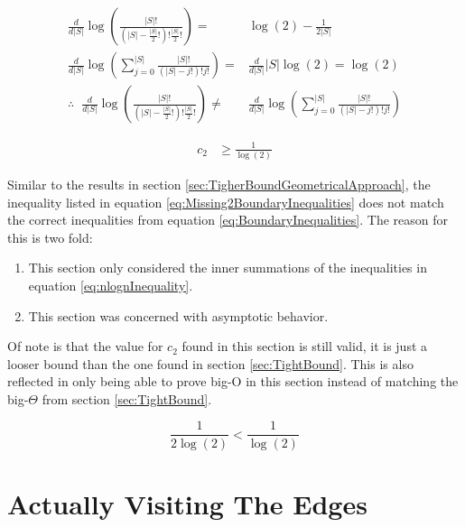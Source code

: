 \documentclass{article}
\begin{document}
\begin{equation*}
	\begin{split}
		\frac{d}{d|S|}				
		\log \left( \frac{
			|S|!
		}{
			\left(|S|-\frac{|S|}{2}!\right)!\frac{|S|}{2}!
		} \right)
		= &
		\log(2)-\frac{1}{2|S|}
		\\
		\frac{d}{d|S|}				
		\log \left( \sum_{j=0}^{|S|} \frac{
			|S|!
		}{
			\left(|S|-j!\right)!j!
		} \right)
		= &
		\frac{d}{d|S|} |S|\log(2)=\log(2)
		\\
		\therefore  \;\;
		\frac{d}{d|S|}				
		\log \left( \frac{
			|S|!
		}{
			\left(|S|-\frac{|S|}{2}!\right)!\frac{|S|}{2}!
		} \right)
		\ne &
		\frac{d}{d|S|}				
		\log \left( \sum_{j=0}^{|S|} \frac{
			|S|!
		}{
			\left(|S|-j!\right)!j!
		} \right)
	\end{split}	
\end{equation*}

\begin{equation}
	\begin{split}
        c_2 &\ge \frac{1}{\log(2)}
	\end{split}
	\label{eq:Missing2BoundaryInequalities}
\end{equation}

Similar to the results in section \ref{sec:TigherBoundGeometricalApproach}, the inequality listed in equation \ref{eq:Missing2BoundaryInequalities} does not match the correct inequalities from equation \ref{eq:BoundaryInequalities}. The reason for this is two fold:

\begin{enumerate}
	\item This section only considered the inner summations of the inequalities in equation \ref{eq:nlognInequality}.
	\item This section was concerned with asymptotic behavior.
\end{enumerate}

Of note is that the value for $c_2$ found in this section is still valid, it is just a looser bound than the one found in section \ref{sec:TightBound}. This is also reflected in only being able to prove big-O in this section instead of matching the big-$\Theta$ from section \ref{sec:TightBound}.

\begin{equation*}
	\frac{1}{2\log(2)}<\frac{1}{\log(2)}
\end{equation*}

\section{Actually Visiting The Edges}
\label{sec:VisitingEdges}
\end{document}

